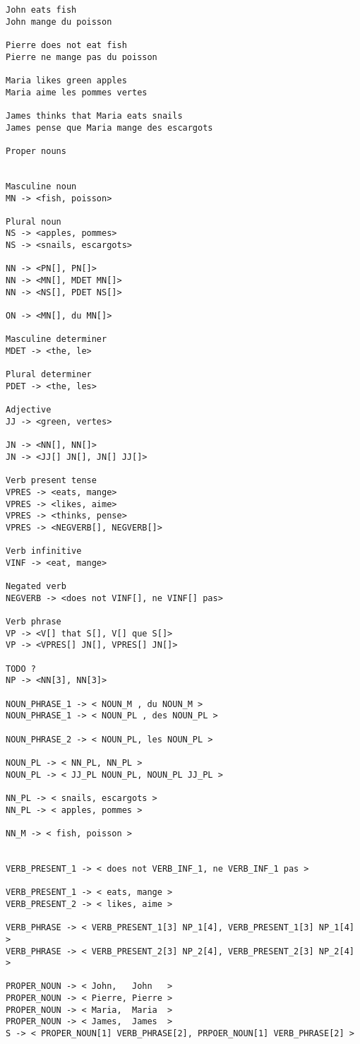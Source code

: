 \documentclass[11pt]{article}
\begin{document}
\begin{verbatim}
John eats fish
John mange du poisson

Pierre does not eat fish
Pierre ne mange pas du poisson

Maria likes green apples
Maria aime les pommes vertes

James thinks that Maria eats snails
James pense que Maria mange des escargots

Proper nouns


Masculine noun
MN -> <fish, poisson>

Plural noun
NS -> <apples, pommes>
NS -> <snails, escargots>

NN -> <PN[], PN[]>
NN -> <MN[], MDET MN[]>
NN -> <NS[], PDET NS[]>

ON -> <MN[], du MN[]>

Masculine determiner
MDET -> <the, le>

Plural determiner
PDET -> <the, les>

Adjective
JJ -> <green, vertes>

JN -> <NN[], NN[]>
JN -> <JJ[] JN[], JN[] JJ[]>

Verb present tense
VPRES -> <eats, mange>
VPRES -> <likes, aime>
VPRES -> <thinks, pense>
VPRES -> <NEGVERB[], NEGVERB[]>

Verb infinitive
VINF -> <eat, mange>

Negated verb
NEGVERB -> <does not VINF[], ne VINF[] pas>

Verb phrase
VP -> <V[] that S[], V[] que S[]>
VP -> <VPRES[] JN[], VPRES[] JN[]>

TODO ?
NP -> <NN[3], NN[3]>

NOUN_PHRASE_1 -> < NOUN_M , du NOUN_M >
NOUN_PHRASE_1 -> < NOUN_PL , des NOUN_PL >

NOUN_PHRASE_2 -> < NOUN_PL, les NOUN_PL >

NOUN_PL -> < NN_PL, NN_PL >
NOUN_PL -> < JJ_PL NOUN_PL, NOUN_PL JJ_PL >

NN_PL -> < snails, escargots >
NN_PL -> < apples, pommes >

NN_M -> < fish, poisson >


VERB_PRESENT_1 -> < does not VERB_INF_1, ne VERB_INF_1 pas >

VERB_PRESENT_1 -> < eats, mange >
VERB_PRESENT_2 -> < likes, aime >

VERB_PHRASE -> < VERB_PRESENT_1[3] NP_1[4], VERB_PRESENT_1[3] NP_1[4] >
VERB_PHRASE -> < VERB_PRESENT_2[3] NP_2[4], VERB_PRESENT_2[3] NP_2[4] >

PROPER_NOUN -> < John,   John   >
PROPER_NOUN -> < Pierre, Pierre >
PROPER_NOUN -> < Maria,  Maria  >
PROPER_NOUN -> < James,  James  >
S -> < PROPER_NOUN[1] VERB_PHRASE[2], PRPOER_NOUN[1] VERB_PHRASE[2] >



\end{verbatim}
\end{document}
